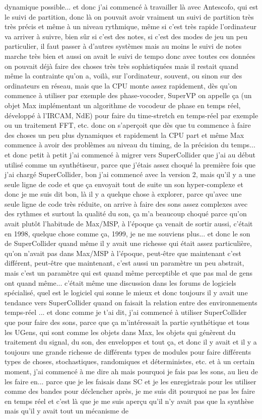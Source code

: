 dynamique possible... et donc j'ai commencé à travailler là avec Antescofo, qui est le suivi de partition, donc là on pouvait avoir vraiment un suivi de partition très très précis et même à un niveau rythmique, même si c'est très rapide l'ordinateur va arriver à suivre, bien sûr si c'est des notes, si c'est des modes de jeu un peu particulier, il faut passer à d'autres systèmes mais au moins le suivi de notes marche très bien et aussi on avait le suivi de tempo donc avec toutes ces données on pouvait déjà faire des choses très très sophistiquées mais il restait quand même la contrainte qu'on a, voilà, sur l'ordinateur, souvent, ou sinon sur des ordinateurs en réseau, mais que la CPU monte assez rapidement, dès qu'on commence à utiliser par exemple des phase-vocoder, SuperVP on appelle ça (un objet Max implémentant un algorithme de vocodeur de phase en temps réel, développé à l'IRCAM, NdE) pour faire du time-stretch en temps-réel par exemple ou un traitement FFT, etc. donc on s'aperçoit que dès que tu commence à faire des choses un peu plus dynamiques et rapidement la CPU part et même Max commence à avoir des problèmes au niveau du timing, de la précision du temps... et donc petit à petit j'ai commencé à migrer vers SuperCollider que j'ai au début utilisé comme un synthétiseur, parce que j'étais assez choqué la première fois que j'ai chargé SuperCollider, bon j'ai commencé avec la version 2, mais qu'il y a une seule ligne de code et que ça envoyait tout de suite un son hyper-complexe et donc je me suis dit bon, là il y a quelque chose à explorer, parce qu'avec une seule ligne de code très réduite, on arrive à faire des sons assez complexes avec des rythmes et surtout la qualité du son, ça m'a beaucoup choqué parce qu'on avait plutôt l'habitude de Max/MSP, à l'époque ça venait de sortir aussi, c'était en 1998, quelque chose comme ça, 1999, je ne me souviens plus... et donc le son de SuperCollider quand même il y avait une richesse qui était assez particulière, qu'on n'avait pas dans Max/MSP à l'époque, peut-être que maintenant c'est différent, peut-être que maintenant, c'est aussi un paramètre un peu abstrait, mais c'est un paramètre qui est quand même perceptible et que pas mal de gens ont quand même... c'était même une discussion dans les forums de logiciels spécialisé, quel est le logiciel qui sonne le mieux et donc toujours il y avait une tendance vers SuperCollider quand on faisait la relation entre des environnements temps-réel ... et donc comme je t'ai dit, j'ai commencé à utiliser SuperCollider que pour faire des sons, parce que ça m'intéressait la partie synthétique et tous les UGens, qui sont comme les objets dans Max, les objets qui génèrent du traitement du signal, du son, des enveloppes et tout ça, et donc il y avait et il y a toujours une grande richesse de différents types de modules pour faire différents types de choses, stochastiques, randomiques et déterministes, etc. et à un certain moment, j'ai commencé à me dire ah mais pourquoi je fais pas les sons, au lieu de les faire en... parce que je les faisais dans SC et je les enregistrais pour les utiliser comme des bandes pour déclencher après, je me suis dit pourquoi ne pas les faire en temps réel et c'est là que je me suis aperçu qu'il n'y avait pas que la synthèse mais qu'il y avait tout un mécanisme de 